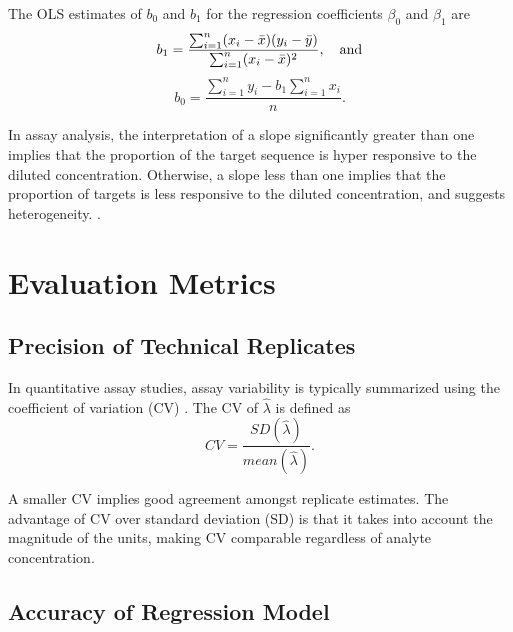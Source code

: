 The OLS estimates of \(b_0\) and \(b_1\) for the regression coefficients \(\beta_0\) and \(\beta_1\) are 
\[
    b_1 = \frac{\sum_{i=1}^{n}(x_i-\bar{x})(y_i - \bar{y})}{\sum_{i=1}^{n}(x_i-\bar{x})^2}, \quad \textup{and}
\]
\[
    b_0 = \frac{\sum_{i=1}^{n}y_i-b_1\sum_{i=1}^{n}x_i}{n}.
\]

In assay analysis, the interpretation of a slope significantly greater than one implies that the proportion of the target sequence is hyper responsive to the diluted concentration. Otherwise, a slope less than one implies that the proportion of targets is less responsive to the diluted concentration, and suggests heterogeneity.  \cite{Hu2009}.


\section{Evaluation Metrics}
\label{sec:evalmetric_ch3}

\subsection{Precision of Technical Replicates}
\label{sec:evalmetric_ch3_cv}

In quantitative assay studies, assay variability is typically summarized using the coefficient of variation (CV) \cite{Reed2003}. The CV of \(\hat{\lambda}\) is defined as
\[
    CV = \frac{SD(\hat{\lambda})}{mean(\hat{\lambda})}.
\]

A smaller CV implies good agreement amongst replicate estimates. The advantage of CV over standard deviation (SD) is that it takes into account the magnitude of the units, making CV comparable regardless of analyte concentration.

\subsection{Accuracy of Regression Model}
\label{sec:evalmetric_ch3_R2ResSE}

